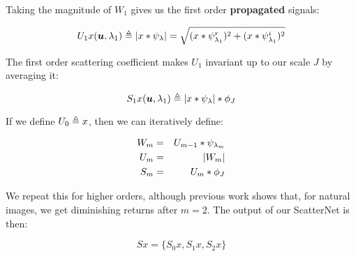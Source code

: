 Taking the magnitude of $W_1$ gives us the first order \textbf{propagated}
signals:

\begin{equation}
  U_1x(\bm{u}, \lambda_1) \triangleq |x\ast \psi_{\lambda}| 
    = \sqrt{(x \ast \psi^r_{\lambda_1})^2 + (x \ast \psi^i_{\lambda_1})^2}
\end{equation}

The first order scattering coefficient makes $U_1$ invariant up to our
scale $J$ by averaging it:

\begin{equation}
  S_1x(\bm{u}, \lambda_1) \triangleq |x\ast \psi_{\lambda}| \ast \phi_J
\end{equation}

If we define $U_0 \triangleq x$, then we can iteratively define:

\begin{eqnarray}
  W_{m} &=& U_{m-1} \ast \psi_{\lambda_{m}} \\
  U_{m} &=& |W_{m}| \\
  S_{m} &=& U_m \ast \phi_J
\end{eqnarray}

We repeat this for higher orders, although previous work shows that, for natural
images, we get diminishing returns after $m=2$. The output of our ScatterNet is
then:

\begin{equation}
  Sx = \{S_0x, S_1x, S_2x\}
\end{equation}

